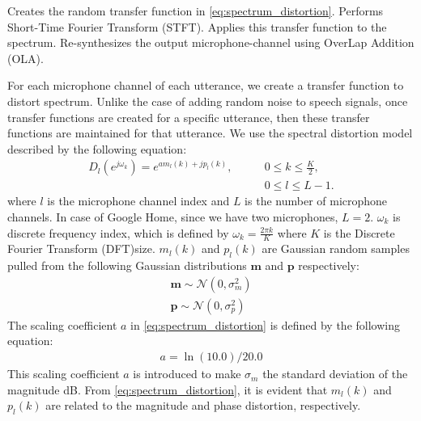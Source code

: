\documentclass[a4paper]{article}
\begin{document}
\vspace{5mm}
\begin{algorithmic}
     \State Creates the random transfer function in \eqref{eq:spectrum_distortion}.
     \State Performs Short-Time Fourier Transform (STFT).
     \State Applies this transfer function to the spectrum.
     \State Re-synthesizes the output microphone-channel using OverLap Addition (OLA).
  \EndFor
\EndFor
\end{algorithmic}
\vspace{5mm}
For each microphone channel of each utterance, we create a transfer function
to distort spectrum. Unlike the case of adding random noise to speech signals,
once transfer functions are created for a specific utterance, then these
transfer functions are maintained for that utterance. We use the spectral
distortion model described by the following equation:
%
\begin{align}
  D_l(e^{j\omega_k}) = e^{a m_l(k) + jp_l(k)}, \qquad
          & 0 \le k \le \frac{K}{2}, \nonumber \\
          & 0 \le l \le L - 1.
  \label{eq:spectrum_distortion}
\end{align}
%
where $l$ is the microphone channel index and $L$ is the number of
microphone channels. In case of Google Home, since we have two microphones,
$L = 2$.
$\omega_k$ is discrete frequency index, which is defined by
$\omega_k = \frac{2 \pi k}{K}$ where $K$ is the Discrete Fourier Transform (DFT)size.
$m_l(k)$ and $p_l(k)$ are Gaussian random samples pulled from the following
Gaussian distributions  $\mathbf{m}$ and $\mathbf{p}$ respectively:
%
\begin{subequations}
  \begin{align}
    \mathbf{m} \sim  \mathcal{N}(0, \sigma_m^2)\\
    \mathbf{p} \sim  \mathcal{N}(0, \sigma_p^2)
  \end{align}
  \label{eq:random_variables}
\end{subequations}
%
The scaling coefficient $a$ in \eqref{eq:spectrum_distortion} is defined
by the following equation:
%
\begin{align}
  a = \ln(10.0) / 20.0
  \label{eq:scaling_coeff_a}
\end{align}
%
This scaling coefficient $a$ is introduced to make $\sigma_m$
the standard deviation of the magnitude dB.
From \eqref{eq:spectrum_distortion}, it is evident that $m_l(k)$ and
$p_l(k)$ are related to the magnitude and phase distortion, respectively.
\end{document}

